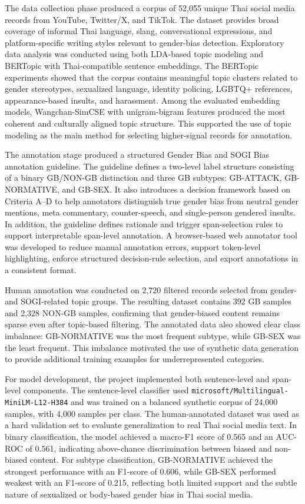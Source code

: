 \documentclass[12pt,oneside,openright,a4paper]{cpe-english-project}
\begin{document}
The data collection phase produced a corpus of 52,055 unique Thai social media records from YouTube, Twitter/X, and TikTok. The dataset provides broad coverage of informal Thai language, slang, conversational expressions, and platform-specific writing styles relevant to gender-bias detection. Exploratory data analysis was conducted using both LDA-based topic modeling and BERTopic with Thai-compatible sentence embeddings. The BERTopic experiments showed that the corpus contains meaningful topic clusters related to gender stereotypes, sexualized language, identity policing, LGBTQ+ references, appearance-based insults, and harassment. Among the evaluated embedding models, Wangchan-SimCSE with unigram-bigram features produced the most coherent and culturally aligned topic structure. This supported the use of topic modeling as the main method for selecting higher-signal records for annotation.

The annotation stage produced a structured Gender Bias and SOGI Bias annotation guideline. The guideline defines a two-level label structure consisting of a binary GB/NON-GB distinction and three GB subtypes: GB-ATTACK, GB-NORMATIVE, and GB-SEX. It also introduces a decision framework based on Criteria A--D to help annotators distinguish true gender bias from neutral gender mentions, meta commentary, counter-speech, and single-person gendered insults. In addition, the guideline defines rationale and trigger span-selection rules to support interpretable span-level annotation. A browser-based web annotator tool was developed to reduce manual annotation errors, support token-level highlighting, enforce structured decision-rule selection, and export annotations in a consistent format.

Human annotation was conducted on 2,720 filtered records selected from gender- and SOGI-related topic groups. The resulting dataset contains 392 GB samples and 2,328 NON-GB samples, confirming that gender-biased content remains sparse even after topic-based filtering. The annotated data also showed clear class imbalance: GB-NORMATIVE was the most frequent subtype, while GB-SEX was the least frequent. This imbalance motivated the use of synthetic data generation to provide additional training examples for underrepresented categories.

For model development, the project implemented both sentence-level and span-level components. The sentence-level classifier used \texttt{microsoft/Multilingual-MiniLM-L12-H384} and was trained on a balanced synthetic corpus of 24,000 samples, with 4,000 samples per class. The human-annotated dataset was used as a hard validation set to evaluate generalization to real Thai social media text. In binary classification, the model achieved a macro-F1 score of 0.565 and an AUC-ROC of 0.561, indicating above-chance discrimination between biased and non-biased content. For subtype classification, GB-NORMATIVE achieved the strongest performance with an F1-score of 0.606, while GB-SEX performed weakest with an F1-score of 0.215, reflecting both limited support and the subtle nature of sexualized or body-based gender bias in Thai social media.
\end{document}
